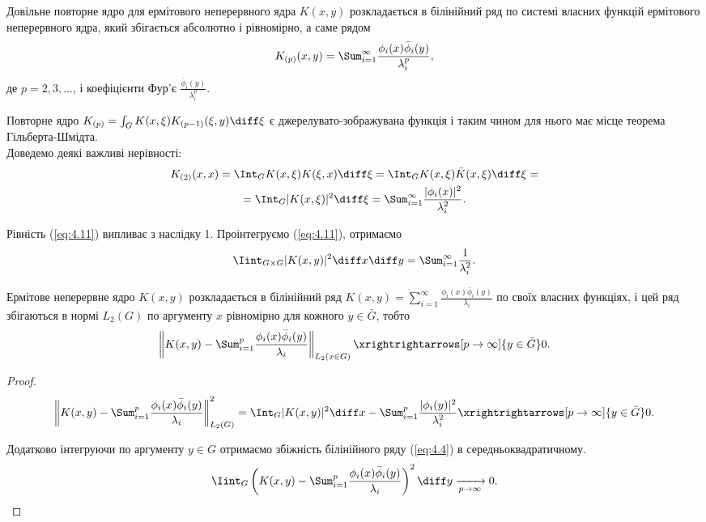 \begin{corollary}
	Довільне повторне ядро для ермітового неперервного ядра $K(x ,y)$ розкладається в білінійний ряд по системі власних функцій ермітового неперервного ядра, який збігається абсолютно і рівномірно, а саме рядом \[K_{(p)}(x, y) = \Sum_{i = 1}^\infty \dfrac{\phi_i(x) \bar \phi_i(y)}{\lambda_i^p},\] де $p = 2, 3, \ldots$, і коефіцієнти Фур'є  $\frac{\bar \phi_i(y)}{\lambda_i^p}$.
\end{corollary}

Повторне ядро $K_{(p)} = \int_G K(x, \xi) K_{(p - 1)} (\xi, y) \diff \xi$ є джерелувато-зображувана функція і таким чином для нього має місце теорема Гільберта-Шмідта. \\

Доведемо деякі важливі нерівності:
\begin{multline}
	\label{eq:4.11}
	K_{(2)} (x, x) = \Int_G K(x, \xi) K(\xi, x) \diff \xi = \Int_G K(x, \xi) \bar K(x, \xi) \diff \xi = \\
	= \Int_G |K(x, \xi)|^2 \diff \xi = \Sum_{i = 1}^\infty \dfrac{|\phi_i(x)|^2}{\lambda_i^2}.
\end{multline}

Рівність (\ref{eq:4.11}) випливає з наслідку 1. Проінтегруємо (\ref{eq:4.11}), отримаємо
\begin{equation}
	\label{eq:4.12}
	\Iint_{G \times G} |K(x, y)|^2 \diff x \diff y = \Sum_{i = 1}^\infty \dfrac{1}{\lambda_i^2}.
\end{equation}

\begin{theorem}
	Ермітове неперервне ядро $K(x, y)$ розкладається в білінійний ряд $K(x, y) = \sum_{i=1}^\infty \frac{\phi_i(x) \bar \phi_i(y)}{\lambda_i}$ по своїх власних функціях, і цей ряд збігаються в нормі $L_2(G)$ по аргументу $x$ рівномірно для кожного $y \in \bar G$, тобто 
	\[ \left\| K(x, y) - \Sum_{i=1}^p \dfrac{\phi_i(x)\bar \phi_i(y)}{\lambda_i}\right\|_{L_2(x \in G)} \xrightrightarrows[p \to \infty]{y \in \bar G} 0. \]
\end{theorem}
\begin{proof}
	\[ \left\| K(x, y) - \Sum_{i = 1}^p \dfrac{\phi_i(x) \bar \phi_i(y)}{\lambda_i} \right\|_{L_2(G)}^2 = \Int_G |K(x, y)|^2 \diff x - \Sum_{i = 1}^p \dfrac{|\phi_i(y)|^2}{\lambda_i^2} \xrightrightarrows[p \to \infty]{y \in \bar G} 0. \]

	Додатково інтегруючи по аргументу $y \in G$ отримаємо збіжність білінійного ряду (\ref{eq:4.4}) в середньоквадратичному.
	\begin{equation}
		\label{eq:4.13}
		\Iint_G \left( K(x, y) - \Sum_{i = 1}^p \dfrac{\phi_i(x) \bar \phi_i(y)}{\lambda_i} \right)^2 \diff y \xrightarrow[p \to \infty]{} 0.
	\end{equation}
\end{proof}


